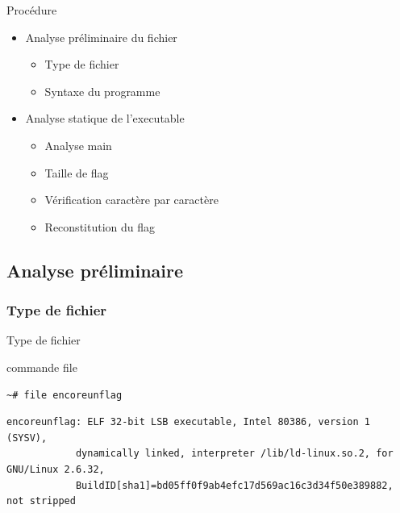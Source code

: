 \documentclass[10pt,sans,usenames,dvipsnames,french,compress]{beamer}
\begin{document}
\begin{frame}{Procédure}
	\begin{itemize}
		\item Analyse préliminaire du fichier
		
		\begin{itemize}
			\item Type de fichier
			\item Syntaxe du programme
		\end{itemize}
		
		\item Analyse statique de l'executable
		
		\begin{itemize}
			\item Analyse main
			\item Taille de flag
			\item Vérification caractère par caractère
			\item Reconstitution du flag
		\end{itemize}
	\end{itemize}
\end{frame}

\subsection{Analyse préliminaire}
\subsubsection{Type de fichier}
\begin{frame}[fragile]{Type de fichier}
	\begin{block}{commande file}
		\vspace{-3mm}
		\begin{lstlisting}[style=Term]
			~# file encoreunflag
		\end{lstlisting}
		\vspace{-2mm}
	\end{block}

	\begin{block}{}
		\vspace{-3mm}
		\begin{lstlisting}[style=Term]
			encoreunflag: ELF 32-bit LSB executable, Intel 80386, version 1 (SYSV), 
			dynamically linked, interpreter /lib/ld-linux.so.2, for GNU/Linux 2.6.32,
			BuildID[sha1]=bd05ff0f9ab4efc17d569ac16c3d34f50e389882, not stripped
		\end{lstlisting}
		\vspace{-2mm}
	\end{block}
\end{frame}
\end{document}

